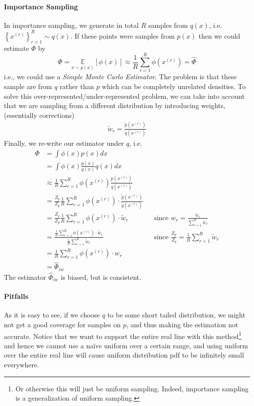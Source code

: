 \documentclass[11pt]{article}
\begin{document}
\paragraph{Importance Sampling}
In importance sampling, we generate in total $R$ samples from $q(x)$, i.e. $\left\{x^{(r)}\right\}_{r=1}^{R} \sim q(x)$. If these points were samples from $p(x)$ then we could estimate $\Phi$ by
\begin{equation}
    \Phi=\underset{x \sim p(x)}{\mathbb{E}}[\phi(x)] \approx \frac{1}{R} \sum_{r=1}^{R} \phi\left(x^{(r)}\right)=\hat{\Phi}
\end{equation}
i.e., we could use a \textit{{Simple Monte Carlo Estimator}}. The problem is that these sample are from $q$ rather than $p$ which can be completely unrelated densities. To solve this over-represented/under-represented problem, we can take into account that we are sampling from a different distribution by introducing weights, (essentially corrections)
\begin{align}
    \tilde{w}_{r}=\frac{\tilde{p}\left(x^{(r)}\right)}{\tilde{q}\left(x^{(r)}\right)}
\end{align}
Finally, we re-write our estimator under $q$, i.e.
\begin{align}
    \Phi 
    &= \int \phi(x) p(x) dx \\
    &= \int \phi(x) \frac{p(x)}{q(x)} q(x) dx \\
    &\approx \frac{1}{R} \sum_{r = 1}^R \phi (x^{(r)}) \frac{p\left(x^{(r)}\right)}{q\left(x^{(r)}\right)} \\
    &= \frac{Z_q}{Z_p} \frac{1}{R}\sum_{r=1}^R \phi(x^{(r)}) \cdot \frac{\tilde p(x^{(r)})}{\tilde q(x^{(r)})}\\ 
    &= \frac{Z_q}{Z_p} \frac{1}{R}\sum_{r=1}^R \phi(x^{(r)}) \cdot \tilde w_r  && \text{since } w_{r}=\frac{\tilde{w}_{r}}{\sum_{r=1}^{R} \tilde{w}_{r}}\\
    &= \frac{\frac{1}{R}\sum_{r=1}^R \phi(x^{(r)}) \cdot \tilde w_r}{\frac{1}{R}\sum_{r=1}^R \tilde w_r} && \text{since } \frac{Z_{p}}{Z_{q}}=\frac{1}{R} \sum_{r=1}^{R} \tilde{w}_{r}\\ 
    &= \frac{1}{R}\sum_{r=1}^R \phi(x^{(r)}) \cdot w_r \\ &= \hat \Phi_{iw}
\end{align}
The estimator $\hat \Phi_{iw}$ is biased, but is consistent.

\paragraph{Pitfalls} As it is easy to see, if we choose $q$ to be some short tailed distribution, we might not get a good coverage for samples on $p$, and thus making the estimation not accurate. Notice that we want to support the entire real line with this method\footnote{Or otherwise this will just be uniform sampling. Indeed, importance sampling is a generalization of uniform sampling. } and hence we cannot use a na\"ive uniform over a certain range, and using uniform over the entire real line will cause uniform distribution pdf to be infinitely small everywhere. 
\end{document}
